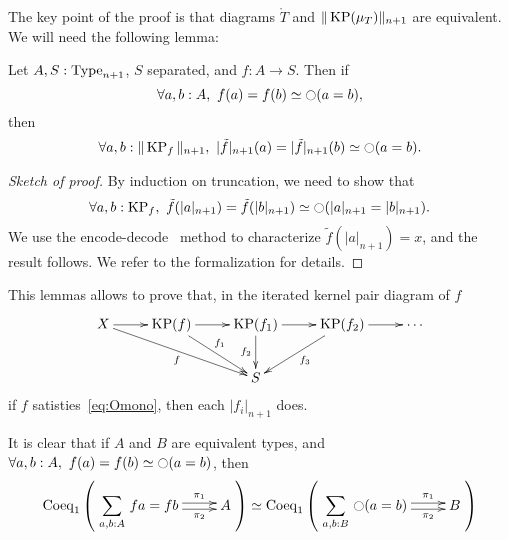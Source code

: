 The key point of the proof is that diagrams $\mathring T$ and $\|\operatorname{KP}(\mu_T)\|_{n+1}$
are equivalent.
We will need the following lemma:

\begin{lem}\label{lem:Omono}
  Let $A,S:\operatorname{Type}_{n+1}$, $S$ separated, and $f:A \to S$. Then if 
  \begin{equation}
    \label{eq:Omono}
    \forall a,b:A,~f (a) = f (b) \simeq \ocircle (a=b),
  \end{equation}
  then
  \[\forall a,b:\|\operatorname{KP}_f\|_{n+1},~|\tilde f|_{n+1} (a) = |\tilde f|_{n+1} (b) \simeq \ocircle (a=b).\]
\end{lem}

\begin{proof}[Sketch of proof]
  By induction on truncation, we need to show that 
  \[\forall a,b:\operatorname{KP}_f,~\tilde f (|a|_{n+1}) = \tilde f (|b|_{n+1} )\simeq
  \ocircle (|a|_{n+1}=|b|_{n+1}).\]%
  We use the encode-decode~\cite[Section 8.9]{hottbook} method to characterize $\tilde f (|a|_{n+1})
  = x$, and the result follows. We refer to the formalization for details.
\end{proof}

This lemmas allows to prove that, in the iterated kernel pair diagram
of $f$
\[
  \xymatrix{
    X \ar[r] \ar[rrd]_f & \KP(f) \ar[r] \ar[rd]^{f_1} & \KP(f_1)
    \ar[r] \ar[d]_{f_2} & \KP(f_2) \ar[r] \ar[ld]^{f_3}& \cdots \\
    && S &&
  }
\]
if $f$ satisties~\ref{eq:Omono}, then each $|f_i|_{n+1}$ does.

\begin{rmq}
It is clear that if $A$ and $B$ are equivalent types, and $\forall a,b:A,~f (a) = f (b) \simeq \ocircle
(a=b)$, then 
\[
    \mathrm{Coeq}_1 \left( 
      \xymatrix{
        \displaystyle{\sumD {a,b} A {f a = f b}} \ar@<-.5ex>[r]_-{\pi_2} \ar@<.5ex>[r]^-{\pi_1} & A
      }
    \right)
    \simeq \mathrm{Coeq}_1 \left( 
      \xymatrix{\displaystyle{\sumD {a,b} B {\modal (a=b)}} \ar@<-.5ex>[r]_-{\pi_2} \ar@<.5ex>[r]^-{\pi_1} & B}
    \right)
  \]
\end{rmq}

